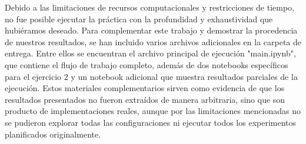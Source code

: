 \documentclass{article}
\begin{document}
Debido a las limitaciones de recursos computacionales y restricciones de tiempo, no fue posible ejecutar la práctica con la profundidad y exhaustividad que hubiéramos deseado. Para complementar este trabajo y demostrar la procedencia de nuestros resultados, se han incluido varios archivos adicionales en la carpeta de entrega. Entre ellos se encuentran el archivo principal de ejecución "main.ipynb", que contiene el flujo de trabajo completo, además de dos notebooks específicos para el ejercicio 2 y un notebook adicional que muestra resultados parciales de la ejecución. Estos materiales complementarios sirven como evidencia de que los resultados presentados no fueron extraídos de manera arbitraria, sino que son producto de implementaciones reales, aunque por las limitaciones mencionadas no se pudieron explorar todas las configuraciones ni ejecutar todos los experimentos planificados originalmente.


\newpage

\end{document}
